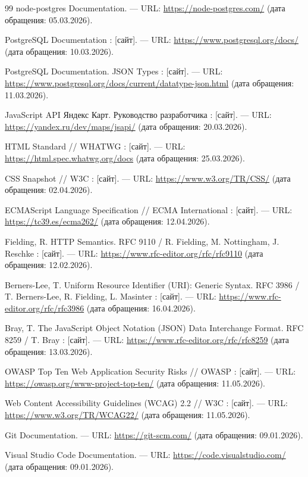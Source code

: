 \begin{thebibliography}{99}
	 node-postgres Documentation. --- URL: \url{https://node-postgres.com/} (дата обращения: 05.03.2026).
	
	 PostgreSQL Documentation : [сайт]. --- URL: \url{https://www.postgresql.org/docs/} (дата обращения: 10.03.2026).
	
	 PostgreSQL Documentation. JSON Types : [сайт]. --- URL: \url{https://www.postgresql.org/docs/current/datatype-json.html} (дата обращения: 11.03.2026).
	
	 JavaScript API Яндекс Карт. Руководство разработчика : [сайт]. --- URL: \url{https://yandex.ru/dev/maps/jsapi/} (дата обращения: 20.03.2026).
	
	 HTML Standard // WHATWG : [сайт]. --- URL: \url{https://html.spec.whatwg.org/docs} (дата обращения: 25.03.2026).
	
	 CSS Snapshot // W3C : [сайт]. --- URL: \url{https://www.w3.org/TR/CSS/} (дата обращения: 02.04.2026).
	
	 ECMAScript Language Specification // ECMA International : [сайт]. --- URL: \url{https://tc39.es/ecma262/} (дата обращения: 12.04.2026).
	
	 Fielding, R. HTTP Semantics. RFC 9110 / R. Fielding, M. Nottingham, J. Reschke : [сайт]. --- URL: \url{https://www.rfc-editor.org/rfc/rfc9110} (дата обращения: 12.02.2026).
	
	 Berners-Lee, T. Uniform Resource Identifier (URI): Generic Syntax. RFC 3986 / T. Berners-Lee, R. Fielding, L. Masinter : [сайт]. --- URL: \url{https://www.rfc-editor.org/rfc/rfc3986} (дата обращения: 16.04.2026).
	
	 Bray, T. The JavaScript Object Notation (JSON) Data Interchange Format. RFC 8259 / T. Bray : [сайт]. --- URL: \url{https://www.rfc-editor.org/rfc/rfc8259} (дата обращения: 13.03.2026).
	
	 OWASP Top Ten Web Application Security Risks // OWASP : [сайт]. --- URL: \url{https://owasp.org/www-project-top-ten/} (дата обращения: 11.05.2026).
	
	 Web Content Accessibility Guidelines (WCAG) 2.2 // W3C : [сайт]. --- URL: \url{https://www.w3.org/TR/WCAG22/} (дата обращения: 11.05.2026).
	
	 Git Documentation. --- URL: \url{https://git-scm.com/} (дата обращения: 09.01.2026).
	
	 Visual Studio Code Documentation. --- URL: \url{https://code.visualstudio.com/} (дата обращения: 09.01.2026).
	
\end{thebibliography}